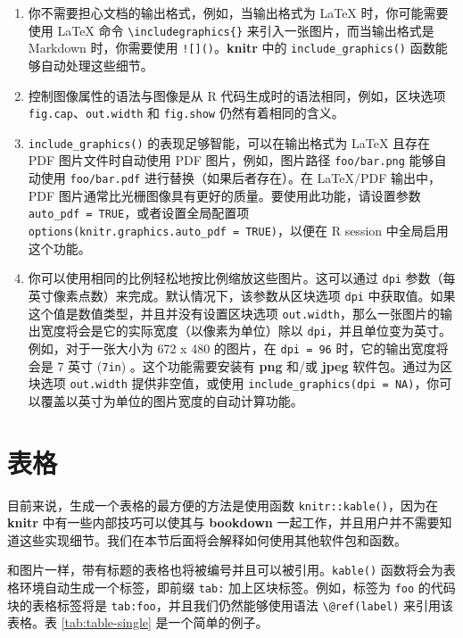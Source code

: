 \documentclass[
  12pt,
]{krantz}
\providecommand{\tightlist}{%
  \setlength{\itemsep}{0pt}\setlength{\parskip}{0pt}}
\theoremstyle{definition}
\theoremstyle{definition}
\theoremstyle{definition}
\theoremstyle{definition}
\theoremstyle{remark}
\begin{document}
\begin{enumerate}
\def\labelenumi{\arabic{enumi}.}
\tightlist
\item
  你不需要担心文档的输出格式，例如，当输出格式为 LaTeX 时，你可能需要使用 LaTeX 命令 \texttt{\textbackslash{}includegraphics\{\}} 来引入一张图片，而当输出格式是 Markdown 时，你需要使用 \texttt{!{[}{]}()}。\textbf{knitr} 中的 \texttt{include\_graphics()} 函数能够自动处理这些细节。
\item
  控制图像属性的语法与图像是从 R 代码生成时的语法相同，例如，区块选项 \texttt{fig.cap}、\texttt{out.width} 和 \texttt{fig.show} 仍然有着相同的含义。
\item
  \texttt{include\_graphics()} 的表现足够智能，可以在输出格式为 LaTeX 且存在 PDF 图片文件时自动使用 PDF 图片，例如，图片路径 \texttt{foo/bar.png} 能够自动使用 \texttt{foo/bar.pdf} 进行替换（如果后者存在）。在 LaTeX/PDF 输出中，PDF 图片通常比光栅图像具有更好的质量。要使用此功能，请设置参数 \texttt{auto\_pdf\ =\ TRUE}，或者设置全局配置项 \texttt{options(knitr.graphics.auto\_pdf\ =\ TRUE)}，以便在 R session 中全局启用这个功能。
\item
  你可以使用相同的比例轻松地按比例缩放这些图片。这可以通过 \texttt{dpi} 参数（每英寸像素点数）来完成。默认情况下，该参数从区块选项 \texttt{dpi} 中获取值。如果这个值是数值类型，并且并没有设置区块选项 \texttt{out.width}，那么一张图片的输出宽度将会是它的实际宽度（以像素为单位）除以 \texttt{dpi}，并且单位变为英寸。例如，对于一张大小为 672 x 480 的图片，在 \texttt{dpi\ =\ 96} 时，它的输出宽度将会是 7 英寸 (\texttt{7in}) 。这个功能需要安装有 \textbf{png} 和/或 \textbf{jpeg} 软件包。通过为区块选项 \texttt{out.width} 提供非空值，或使用 \texttt{include\_graphics(dpi\ =\ NA)}，你可以覆盖以英寸为单位的图片宽度的自动计算功能。
\end{enumerate}

\hypertarget{tables}{%
\section{表格}\label{tables}}

目前来说，生成一个表格的最方便的方法是使用函数 \texttt{knitr::kable()}，因为在 \textbf{knitr} 中有一些内部技巧可以使其与 \textbf{bookdown} 一起工作，并且用户并不需要知道这些实现细节。我们在本节后面将会解释如何使用其他软件包和函数。

和图片一样，带有标题的表格也将被编号并且可以被引用。\texttt{kable()} 函数将会为表格环境自动生成一个标签，即前缀 \texttt{tab:} 加上区块标签。例如，标签为 \texttt{foo} 的代码块的表格标签将是 \texttt{tab:foo}，并且我们仍然能够使用语法 \texttt{\textbackslash{}@ref(label)} 来引用该表格。表 \ref{tab:table-single} 是一个简单的例子。
\end{document}
